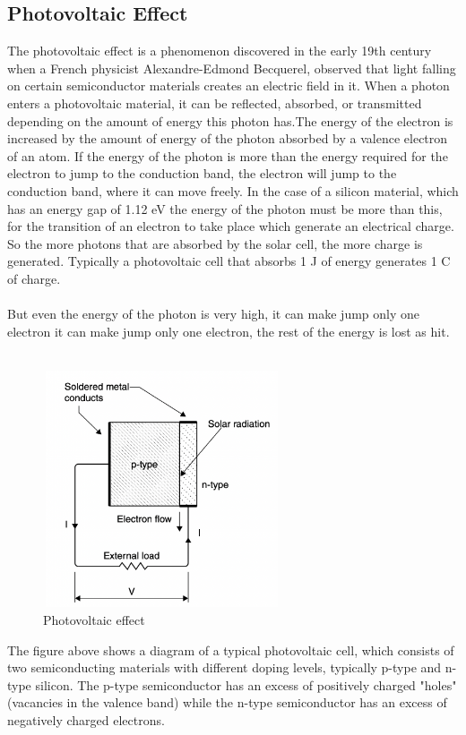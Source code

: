 \documentclass{report}
\begin{document}
\subsection{Photovoltaic Effect}
The photovoltaic effect is a phenomenon discovered in the early 19th century when a French physicist Alexandre-Edmond Becquerel, observed that light falling on certain semiconductor materials creates an electric field in it. When a photon enters a photovoltaic material,  it can be reflected, absorbed, or transmitted depending on the amount of energy this photon has.The energy of the electron is increased by the amount of energy of the photon absorbed by a valence electron of an atom. If the energy of the photon is more than the energy required for the electron to jump to the conduction band, the electron will jump to the conduction band, where it can move freely. In the case of a silicon material, which has an energy gap of 1.12 eV the energy of the photon must be more than this, for the transition of an electron to take place which generate an electrical charge. So the more photons that are absorbed by the solar cell, the more charge is generated. Typically a photovoltaic cell that absorbs 1 J of energy generates 1 C of charge.\\
\\
But even the energy of the photon is very high,  it can make jump only one electron it can make jump only one electron, the rest of the energy is lost as hit. \\
\\
\begin{figure}[h!]
    \centering
    \includegraphics[width=7cm, height=7cm]{phe.png}
    \caption{Photovoltaic effect\cite{kalogiroubook}}
    \label{fig:my_label}
\end{figure}
\hfill \break
The figure above shows a diagram of a typical photovoltaic cell, which consists of two semiconducting materials with different doping levels, typically p-type and n-type silicon. The p-type semiconductor has an excess of positively charged "holes" (vacancies in the valence band) while the n-type semiconductor has an excess of negatively charged electrons.\\
\end{document}
